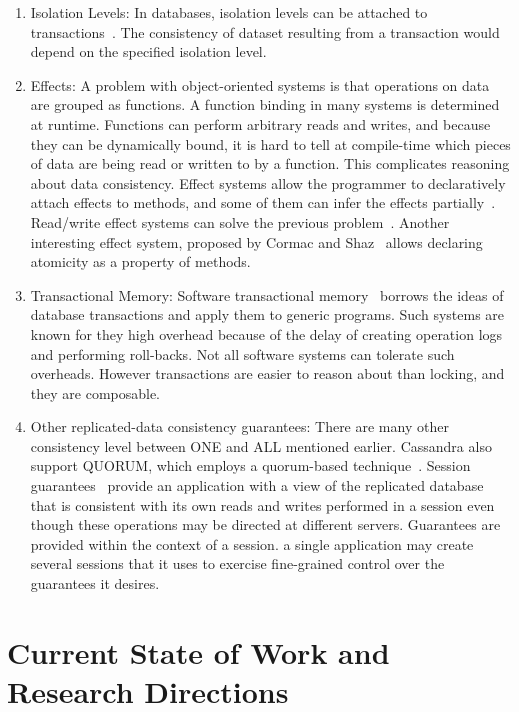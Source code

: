 \documentclass[]{usiinfprospectus}
\begin{document}
\begin{enumerate}
\item Isolation Levels: In databases, isolation levels can be attached to transactions~\cite{bernstein2009sql}. The consistency of dataset resulting from a transaction would depend on the specified isolation level.

\item Effects: A problem with object-oriented systems is that operations on data are grouped as functions. A function binding in many systems is determined at runtime. Functions can perform arbitrary reads and writes, and because they can be dynamically bound, it is hard to tell at compile-time which pieces of data are being read or written to by a function. This complicates reasoning about data consistency. Effect systems allow the programmer to  declaratively attach effects to methods, and some of them can infer the effects partially~\cite{marino2009generic}. Read/write effect systems can solve the previous problem~\cite{Lucassen:1988:PES:73560.73564}. Another interesting effect system, proposed by Cormac and Shaz~\cite{flanagan2003type} allows declaring atomicity as a property of methods.

\item Transactional Memory: Software transactional memory~\cite{shavit1997software} borrows the ideas of database transactions and apply them to generic programs. Such systems are known for they high overhead because of the delay of creating operation logs and performing roll-backs. Not all software systems can tolerate such overheads. However transactions are easier to reason about than locking, and they are composable.

\item Other replicated-data consistency guarantees: There are many other consistency level between ONE and ALL mentioned earlier. Cassandra also support QUORUM, which employs a quorum-based technique~\cite{gifford1979weighted}. Session guarantees~\cite{terry1994session} provide an application with a view of the replicated database that is consistent with its own reads and writes performed in a session even though these operations may be directed at different servers. Guarantees are provided within the context of a session. a single application may create several sessions that it uses to exercise fine-grained control over the guarantees it desires.
\end{enumerate}


\section{Current State of Work and Research Directions}
\end{document}
